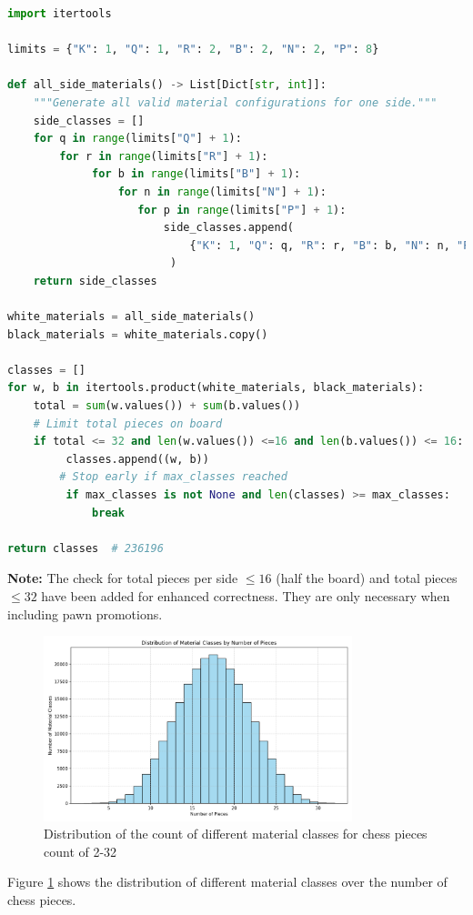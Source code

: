 \documentclass[12pt]{article}
\begin{document}
\begin{lstlisting}[language=Python, caption={Enumeration of all material classes in chess}, label={lst:material-classes}]
import itertools

limits = {"K": 1, "Q": 1, "R": 2, "B": 2, "N": 2, "P": 8}

def all_side_materials() -> List[Dict[str, int]]:
    """Generate all valid material configurations for one side."""
    side_classes = []
    for q in range(limits["Q"] + 1):
        for r in range(limits["R"] + 1):
             for b in range(limits["B"] + 1):
                 for n in range(limits["N"] + 1):
                    for p in range(limits["P"] + 1):
                        side_classes.append(
                            {"K": 1, "Q": q, "R": r, "B": b, "N": n, "P": p}
                         )
    return side_classes

white_materials = all_side_materials()
black_materials = white_materials.copy()

classes = []
for w, b in itertools.product(white_materials, black_materials):
    total = sum(w.values()) + sum(b.values())
    # Limit total pieces on board
    if total <= 32 and len(w.values()) <=16 and len(b.values()) <= 16:
         classes.append((w, b))
        # Stop early if max_classes reached
         if max_classes is not None and len(classes) >= max_classes:
             break

return classes  # 236196
\end{lstlisting}

\noindent
\textbf{Note:} The check for total pieces per side $\leq 16$ (half the board) and total
pieces $\leq 32$ have been added for enhanced correctness. They are only necessary when including pawn promotions.

\begin{figure}[h!]
  \centering
  \includegraphics[width=0.8\textwidth]{material_class_histogram.png}
  \caption{Distribution of the count of different material classes for chess pieces count of 2-32}
  \label{fig:material_class_hist}
\end{figure}
Figure \ref{fig:material_class_hist} shows the distribution of different material classes over the number of chess pieces.
\end{document}
